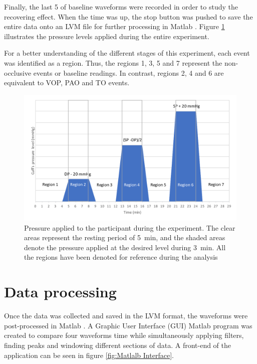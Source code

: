 Finally, the last \SI{5}{\min} of baseline waveforms were recorded in order to study the recovering effect. When the time was up, the stop button was pushed to save the entire data onto an LVM file for further processing in Matlab \cite{MATLAB:2016}. Figure \ref{fig:pressure applied} illustrates the pressure levels applied during the entire experiment.

For a better understanding of the different stages of this experiment, each event was identified as a region. Thus, the regions 1, 3, 5 and 7 represent the non-occlusive events or baseline readings. In contrast, regions 2, 4 and 6 are equivalent to VOP, PAO and TO events.

\begin{figure}[!htpb]
	\centering
	\includegraphics[width=15cm,keepaspectratio]{figure3}
	\caption[Pressure and rdescription of regions during the experiment]{Pressure applied to the participant during the experiment. The clear areas represent the resting period of \SI{5}{\minute}, and the shaded areas denote the pressure applied at the desired level during \SI{3}{\minute}. All the regions have been denoted for reference during the analysis}
	\label{fig:pressure applied}
\end{figure}

\section{Data processing}
\label{section procedure 2}
Once the data was collected and saved in the LVM format, the waveforms were post-processed in Matlab \cite{MATLAB:2016}. A Graphic User Interface (GUI) Matlab program was created to compare four waveforms time while simultaneously applying filters, finding peaks and windowing different sections of data. A front-end of the application can be seen in figure \ref{fig:Matlalb Interface}.

